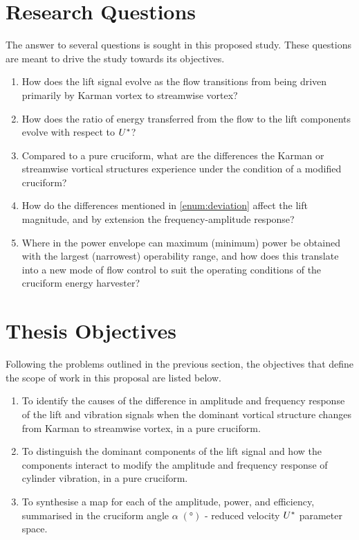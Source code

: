 \documentclass[oneside]{utmthesis}
\begin{document}
\section{Research Questions} \label{sec:resQue}
The answer to several questions is sought in this proposed study. These questions are meant to drive the study towards its objectives.
\begin{enumerate}
  \item How does the lift signal evolve as the flow transitions from being driven primarily by Karman vortex to streamwise vortex?
  \item How does the ratio of energy transferred from the flow to the lift components evolve with respect to $U^{*}$?
  \item Compared to a pure cruciform, what are the differences the Karman or streamwise vortical structures experience under the condition of a modified cruciform? \label{enum:deviation}
  \item How do the differences mentioned in \ref{enum:deviation} affect the lift magnitude, and by extension the frequency-amplitude response?
  \item Where in the power envelope can maximum (minimum) power be obtained with the largest (narrowest) operability range, and how does this translate into a new mode of flow control to suit the operating conditions of the cruciform energy harvester?
\end{enumerate}

\section{Thesis Objectives} \label{sec:thesisObj}
Following the problems outlined in the previous section, the objectives that define the scope of work in this proposal are listed below.

\begin{enumerate}
  \item To identify the causes of the difference in amplitude and frequency response of the lift and vibration signals when the dominant vortical structure changes from Karman to streamwise vortex, in a pure cruciform. \label{enum:whatHappens}

  \item To distinguish the dominant components of the lift signal and how the components interact to modify the amplitude and frequency response of cylinder vibration, in a pure cruciform. \label{enum:characteriseLift}

  \item To synthesise a map for each of the amplitude, power, and efficiency, summarised in the cruciform angle $\alpha \; (\si{\degree})$ - reduced velocity $U^{*}$ parameter space. \label{enum:passiveControl}
\end{enumerate}
\end{document}
